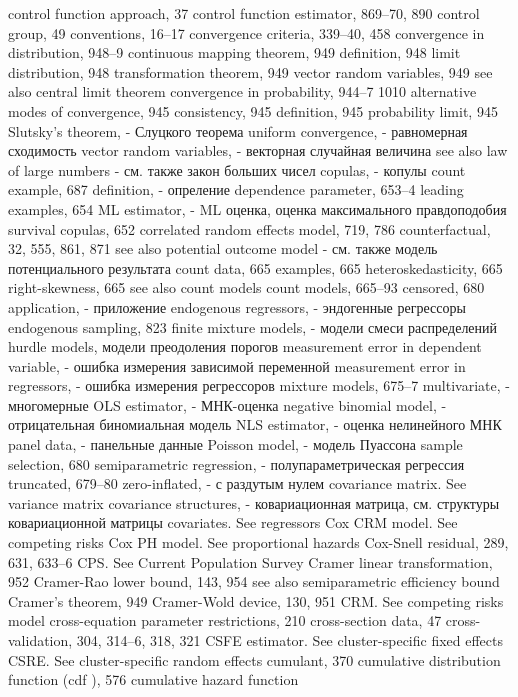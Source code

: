 control function approach, 37
control function estimator, 869–70, 890 control group, 49
conventions, 16–17
convergence criteria, 339–40, 458 convergence in distribution, 948–9
continuous mapping theorem, 949 definition, 948
limit distribution, 948 transformation theorem, 949 vector random variables, 949
see also central limit theorem convergence in probability, 944–7
1010
alternative modes of convergence, 945
consistency, 945
definition, 945
probability limit, 945
Slutsky’s theorem, - Слуцкого теорема 
uniform convergence, - равномерная сходимость 
vector random variables, - векторная случайная величина 
see also law of large numbers - см. также закон больших чисел
copulas, - копулы
count example, 687 
definition, - опреление
dependence parameter, 653–4 leading examples, 654
ML estimator, - ML оценка, оценка максимального правдоподобия
survival copulas, 652
correlated random effects model, 719, 786 counterfactual, 32, 555, 861, 871
see also potential outcome model - см. также модель потенциального результата
count data, 665
examples, 665 heteroskedasticity, 665 right-skewness, 665 see also count models
count models, 665–93
censored, 680
application, - приложение
endogenous regressors, - эндогенные регрессоры 
endogenous sampling, 823
finite mixture models, - модели смеси распределений
hurdle models, модели преодоления порогов
measurement error in dependent variable, - ошибка измерения зависимой переменной 
measurement error in regressors, - ошибка измерения регрессоров 
mixture models, 675–7
multivariate, - многомерные
OLS estimator, - МНК-оценка
negative binomial model, - отрицательная биномиальная модель
NLS estimator, - оценка нелинейного МНК
panel data, - панельные данные
Poisson model, - модель Пуассона
sample selection, 680
semiparametric regression, - полупараметрическая регрессия
truncated, 679–80
zero-inflated, - с раздутым нулем
covariance matrix. See variance matrix covariance structures, - ковариационная матрица, см. структуры ковариационной матрицы 
covariates. See regressors
Cox CRM model. See competing risks
Cox PH model. See proportional hazards Cox-Snell residual, 289, 631, 633–6 CPS. See Current Population Survey Cramer linear transformation, 952 Cramer-Rao lower bound, 143, 954
see also semiparametric efficiency bound Cramer’s theorem, 949
Cramer-Wold device, 130, 951
CRM. See competing risks model cross-equation parameter restrictions, 210 cross-section data, 47
cross-validation, 304, 314–6, 318, 321
CSFE estimator. See cluster-specific fixed effects CSRE. See cluster-specific random effects cumulant, 370
cumulative distribution function (cdf ), 576 cumulative hazard function
